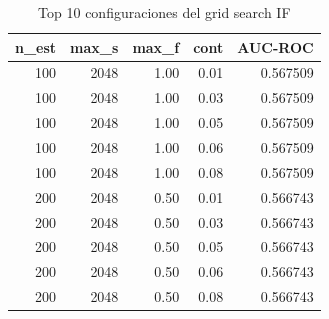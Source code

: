 \begin{table}[htbp]
\centering
\small
\caption{Top 10 configuraciones del grid search IF}
\label{tab:grid-search-top10}
\begin{tabular}{rrrrr}
\toprule
n\_est & max\_s & max\_f & cont & AUC-ROC \\
\midrule
  100 & 2048 & 1.00 & 0.01 & 0.567509 \\
  100 & 2048 & 1.00 & 0.03 & 0.567509 \\
  100 & 2048 & 1.00 & 0.05 & 0.567509 \\
  100 & 2048 & 1.00 & 0.06 & 0.567509 \\
  100 & 2048 & 1.00 & 0.08 & 0.567509 \\
  200 & 2048 & 0.50 & 0.01 & 0.566743 \\
  200 & 2048 & 0.50 & 0.03 & 0.566743 \\
  200 & 2048 & 0.50 & 0.05 & 0.566743 \\
  200 & 2048 & 0.50 & 0.06 & 0.566743 \\
  200 & 2048 & 0.50 & 0.08 & 0.566743 \\
\bottomrule
\end{tabular}
\end{table}
